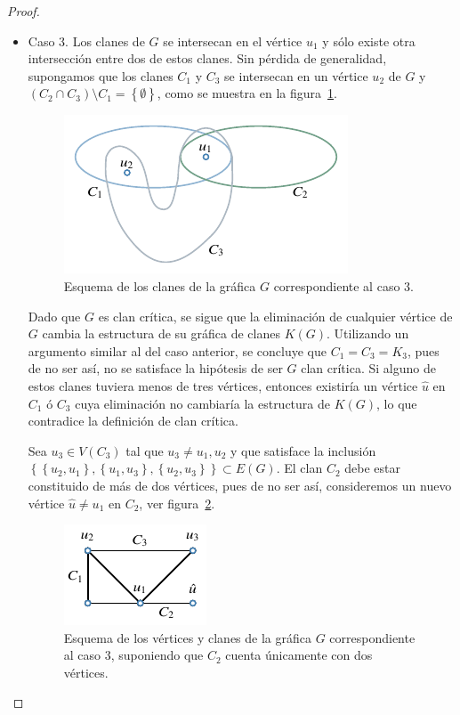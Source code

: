 \documentclass[12pt]{book}
\theoremstyle{definition}
\begin{document}
\begin{proof}
\begin{itemize}
\item Caso 3.
Los clanes de $G$ se intersecan en el vértice $u_1$ y sólo existe otra intersección entre dos de estos clanes. Sin pérdida de generalidad, supongamos que los clanes $C_1$ y $C_3$ se intersecan en un vértice $u_2$ de $G$ y $(C_2\cap C_3)\setminus C_1=\left\{\emptyset\right\}$, como se muestra en la figura~\ref{F3}.

\begin{figure}[!htbp]
	\centering
	\includegraphics[scale=1.2]{Fig3.pdf}
	\caption{Esquema de los clanes de la gráfica $G$ correspondiente al caso 3.\label{F3}}
\end{figure}

Dado que $G$ es clan crítica, se sigue que la eliminación de cualquier vértice de $G$ cambia la estructura de su gráfica de clanes $K(G)$. Utilizando un argumento similar al del caso anterior, se concluye que $C_1=C_3=K_3$, pues de no ser así, no se satisface la hipótesis de ser $G$ clan crítica. Si alguno de estos clanes tuviera menos de tres vértices, entonces existiría un vértice $\hat{u}$ en $C_1$ ó $C_3$ cuya eliminación no cambiaría la estructura de $K(G)$, lo que contradice la definición de clan crítica.

Sea $u_3\in V(C_3)$ tal que $u_3\neq u_1,u_2$ y que satisface la inclusión $\left\{\left\{u_2,u_1\right\},\left\{u_1,u_3\right\},\left\{u_2,u_3\right\}\right\}\subset E(G)$. El clan $C_2$ debe estar constituido de más de dos vértices, pues de no ser así, consideremos un nuevo vértice $\hat{u}\neq u_1$ en $C_2$, ver figura~\ref{F4}.

\begin{figure}[!htbp]
	\centering
	\includegraphics[scale=1.2]{Fig4.pdf}
	\caption{Esquema de los vértices y clanes de la gráfica $G$ correspondiente al caso 3, suponiendo que $C_2$ cuenta únicamente con dos vértices.\label{F4}}
\end{figure}


\end{itemize}
\end{proof}
\end{document}
